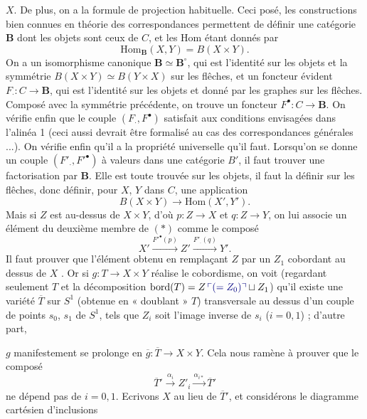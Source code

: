 \documentclass[11pt,a4paper]{article}
\begin{document}

$X$. De plus, on a la formule  de projection
habituelle. Ceci posé, les constructions bien connues en théorie des
correspondances permettent de définir une catégorie $\mathbf{B}$ dont les
objets sont ceux de $C$, et les Hom étant donnés par
\[
\mathrm{Hom}_{\mathbf{B}}(X, Y) = B(X \times Y) .
\]
On a un isomorphisme canonique $\mathbf{B} \simeq \mathbf{B}^{\circ}$, qui
est l'identité sur les objets et la symmétrie $B(X \times Y) \simeq B(Y
\times X)$ sur les flêches, et un foncteur évident $F_{\cdot} : C \to
\mathbf{B}$, qui est l'identité sur les objets et donné par les graphes sur
les flêches. Composé avec la symmétrie précédente, on trouve un foncteur
$F^{\bullet} : C \to \mathbf{B}$. On vérifie enfin que le couple
$(F_{\cdot}, F^{\bullet})$ satisfait aux conditions envisagées dans l'alinéa 1
(ceci aussi devrait être formalisé au cas des correspondances générales
...). On vérifie enfin qu'il a la propriété universelle qu'il faut.
Lorsqu'on se donne un couple $(F'_{\cdot}, F'^{\bullet})$ à valeurs dans une
catégorie $B'$, il faut trouver une factorisation par $\mathbf{B}$. Elle est
toute trouvée sur les objets, il faut la définir sur les flêches, donc
définir, pour $X$, $Y$ dans $C$, une application
\[
B(X \times Y) \longrightarrow \mathrm{Hom}(X', Y') . \tag{$*$}
\]
Mais si $Z$ est au-dessus de $X \times Y$, d'où $p : Z \to X$ et $q : Z \to
Y$, on lui associe un élément du deuxième membre de $(*)$ comme le composé
\[
X' \xrightarrow{F'^{\bullet}(p)} Z' \xrightarrow{F'_{\cdot}(q)} Y' .
\]
Il faut prouver que l'élément obtenu en remplaçant $Z$ par un $Z_{1}$
cobordant au dessus de $X$ . Or si $g : T \to X \times Y$
réalise le cobordisme, on voit (regardant seulement $T$ et la décomposition
$\mathrm{bord}(T) = Z\,\add{(= Z_{0})} \sqcup Z_{1}$) qu'il existe une variété $\overline{T}$
sur $S^{1}$ (obtenue en « doublant » $T$) transversale au dessus d'un couple de
points $s_{0}$, $s_{1}$ de $S^{1}$, tels que $Z_{i}$ soit l'image inverse
 de $s_{i}$ ($i = 0, 1$) ; d'autre part,


$g$ manifestement se prolonge en $\overline{g} : \overline{T} \to X \times
Y$. Cela nous ramène à prouver que le composé
\[
\overline{T}' \xrightarrow{\alpha_{i}} Z'_{i}
\xrightarrow{\alpha_{i*}} \overline{T}'
\]
ne dépend pas de $i = 0, 1$. Ecrivons $X$ au lieu de $\overline{T}'$, et
considérons le diagramme cartésien d'inclusions
\end{document}

